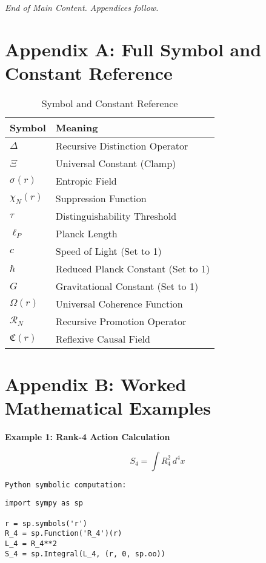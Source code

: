 \documentclass[12pt,a4paper]{article}
\begin{document}
\bigskip
\begin{center}
    \textit{End of Main Content. Appendices follow.}
\end{center}
\appendix

\section{Appendix A: Full Symbol and Constant Reference}

\begin{table}[h]
\centering
\begin{tabular}{|l|l|}
\hline
\textbf{Symbol} & \textbf{Meaning} \\
\hline
\(\Delta\) & Recursive Distinction Operator \\
\(\Xi\) & Universal Constant (Clamp) \\
\(\sigma(r)\) & Entropic Field \\
\(\chi_N(r)\) & Suppression Function \\
\(\tau\) & Distinguishability Threshold \\
\(\ell_P\) & Planck Length \\
\(c\) & Speed of Light (Set to 1) \\
\(\hbar\) & Reduced Planck Constant (Set to 1) \\
\(G\) & Gravitational Constant (Set to 1) \\
\(\Omega(r)\) & Universal Coherence Function \\
\(\mathcal{R}_N\) & Recursive Promotion Operator \\
\(\mathfrak{C}(r)\) & Reflexive Causal Field \\
\hline
\end{tabular}
\caption{Symbol and Constant Reference}
\end{table}

\section{Appendix B: Worked Mathematical Examples}

\textbf{Example 1: Rank-4 Action Calculation}

\[
S_4 = \int R_4^2 \, d^4x
\]

\texttt{Python symbolic computation:}

\begin{verbatim}
import sympy as sp

r = sp.symbols('r')
R_4 = sp.Function('R_4')(r)
L_4 = R_4**2
S_4 = sp.Integral(L_4, (r, 0, sp.oo))
\end{verbatim}
\end{document}
